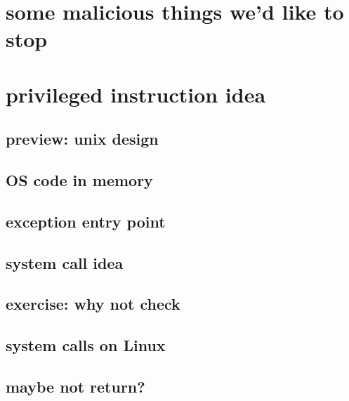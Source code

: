 \section{some malicious things we'd like to stop}



\section{privileged instruction idea}


\subsection{preview: unix design}


\subsection{OS code in memory}


\subsection{exception entry point}


\subsection{system call idea}


\subsection{exercise: why not check}



\subsection{system calls on Linux}


\subsection{maybe not return?}



